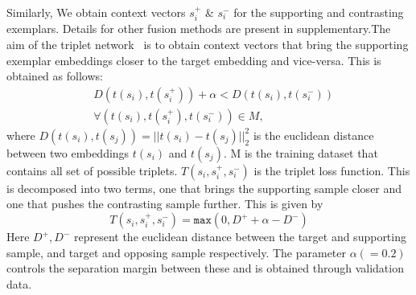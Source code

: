 \documentclass[11pt,a4paper]{article}
\begin{document}
 Similarly, We obtain context vectors  $s^+_i$ \& $s^-_i$ for the supporting and contrasting exemplars. Details for other fusion methods are present in supplementary.The aim of the triplet network~\cite{Schroff_CVPR2015} is to obtain context vectors that bring the supporting exemplar embeddings closer to the target embedding and vice-versa.
This is obtained as follows:
\begin{equation}
 \begin{split}
& D(t(s_{i}),t(s_{i}^{+})) +\alpha < D(t(s_{i}),t(s_{i}^{-}))\\
& \forall{(t(s_{i}),t(s_{i}^{+}),t(s_{i}^{-}))} \in M,
\end{split}
\end{equation}
where $D(t(s_{i}),t(s_{j})) = ||t(s_{i})- t(s_{j})||_{2}^{2}$ is the euclidean distance between two embeddings $t(s_{i})$ and  $t(s_{j})$. M is the training dataset that contains all set of possible triplets. $T(s_i, s_i^{+}, s_i^{-})$ is the triplet loss function. This is decomposed into two terms, one that brings the supporting sample closer and one that pushes the contrasting sample further. This is given by 
\begin{equation} 
    T(s_i,s_i^+,s_i^-) =\texttt{max}(0,  D^{+} + \alpha - D^{-})
    \label{triplet_loss}
\end{equation}
\noindent Here $D^+,D^-$ represent the euclidean distance between the target and supporting sample, and target and opposing sample respectively. The parameter $\alpha(=0.2)$ controls the separation margin between these and is obtained through validation data.
\end{document}
